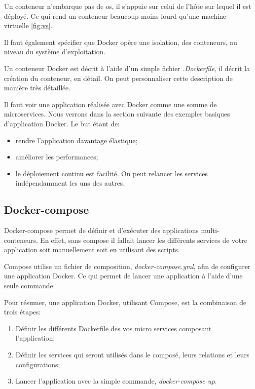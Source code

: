 Un conteneur n'embarque pas de \gls{os}, il s'appuie sur celui de l'hôte sur lequel il est déployé. Ce qui rend un conteneur beaucoup moins lourd qu'une machine virtuelle \ref{fig:vs}.

Il faut également spécifier que Docker opère une isolation, des conteneurs, au niveau du système d'exploitation. 

Un conteneur Docker est décrit à l'aide d'un simple fichier \emph{.Dockerfile}, il décrit la création du conteneur, en détail. On peut personnaliser cette description de manière très détaillée. 

Il faut voir une application réalisée avec Docker comme une somme de microservices. Nous verrons dans la section suivante des exemples basiques d'application Docker. Le but étant de:

\begin{itemize}
\item rendre l'application davantage élastique;
\item améliorer les performances;
\item le déploiement continu est facilité. On peut relancer les services indépendamment les uns des autres.
\end{itemize}


\subsection{Docker-compose}
Docker-compose permet de définir et d'exécuter des applications multi-conteneurs. En effet, sans compose il fallait lancer les différents services de votre application soit manuellement soit en utilisant des scripts.

Compose utilise un fichier de composition, \emph{docker-compose.yml}, afin de configurer une application Docker. Ce qui permet de lancer une application à l'aide d'une seule commande. 

Pour résumer, une application Docker, utilisant Compose, est la combinaison de trois étapes:

\begin{enumerate}
\item Définir les différents Dockerfile des vos micro services composant l'application;
\item Définir les services qui seront utilisés dans le composé, leurs relations et leurs configurations;
\item Lancer l'application avec la simple commande, \emph{docker-compose up}.
\end{enumerate}

